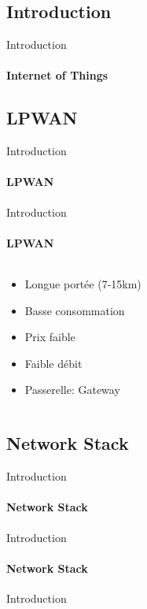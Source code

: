 \subsection{Introduction}

\begin{frame}{Introduction}
\framesubtitle{Internet of Things}

\end{frame}

\subsection{LPWAN}

\begin{frame}{Introduction}
\framesubtitle{LPWAN}

\end{frame}

\begin{frame}{Introduction}
\framesubtitle{LPWAN}
\begin{columns}
  \begin{column}{0.5\textwidth}
  \begin{itemize}
    \item Longue portée (7-15km)
    \item Basse consommation
    \item Prix faible
    \item Faible débit
    \item Passerelle: Gateway
  \end{itemize}
  \end{column}
  \begin{column}{0.5\textwidth}
      
  \end{column}
\end{columns}
\end{frame}

\subsection{Network Stack}

\begin{frame}{Introduction}
\framesubtitle{Network Stack}

\end{frame}

\begin{frame}{Introduction}
\framesubtitle{Network Stack}

\end{frame}

\begin{frame}{Introduction}
\framesubtitle{}
\end{frame}
